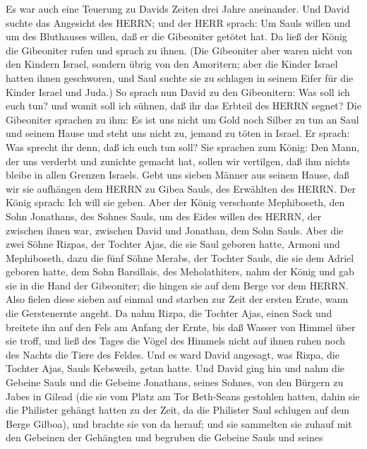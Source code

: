  Es war auch eine Teuerung zu Davids Zeiten drei Jahre
aneinander. Und David suchte das Angesicht des HERRN; und der HERR
sprach: Um Sauls willen und um des Bluthauses willen, daß er die
Gibeoniter getötet hat.  Da ließ der König die Gibeoniter
rufen und sprach zu ihnen. (Die Gibeoniter aber waren nicht von den
Kindern Israel, sondern übrig von den Amoritern; aber die Kinder Israel
hatten ihnen geschworen, und Saul suchte sie zu schlagen in seinem Eifer
für die Kinder Israel und Juda.)  So sprach nun David zu den
Gibeonitern: Was soll ich euch tun? und womit soll ich sühnen, daß ihr
das Erbteil des HERRN segnet?  Die Gibeoniter sprachen zu
ihm: Es ist uns nicht um Gold noch Silber zu tun an Saul und seinem
Hause und steht uns nicht zu, jemand zu töten in Israel. Er sprach: Was
sprecht ihr denn, daß ich euch tun soll?  Sie sprachen zum
König: Den Mann, der uns verderbt und zunichte gemacht hat, sollen wir
vertilgen, daß ihm nichts bleibe in allen Grenzen Israels. 
Gebt uns sieben Männer aus seinem Hause, daß wir sie aufhängen dem HERRN
zu Gibea Sauls, des Erwählten des HERRN. Der König sprach: Ich will sie
geben.  Aber der König verschonte Mephiboseth, den Sohn
Jonathans, des Sohnes Sauls, um des Eides willen des HERRN, der zwischen
ihnen war, zwischen David und Jonathan, dem Sohn Sauls. 
Aber die zwei Söhne Rizpas, der Tochter Ajas, die sie Saul geboren
hatte, Armoni und Mephiboseth, dazu die fünf Söhne Merabs, der Tochter
Sauls, die sie dem Adriel geboren hatte, dem Sohn Barsillais, des
Meholathiters, nahm der König  und gab sie in die Hand der
Gibeoniter; die hingen sie auf dem Berge vor dem HERRN. Also fielen
diese sieben auf einmal und starben zur Zeit der ersten Ernte, wann die
Gerstenernte angeht.  Da nahm Rizpa, die Tochter Ajas,
einen Sack und breitete ihn auf den Fels am Anfang der Ernte, bis daß
Wasser von Himmel über sie troff, und ließ des Tages die Vögel des
Himmels nicht auf ihnen ruhen noch des Nachts die Tiere des Feldes.
 Und es ward David angesagt, was Rizpa, die Tochter Ajas,
Sauls Kebsweib, getan hatte.  Und David ging hin und nahm
die Gebeine Sauls und die Gebeine Jonathans, seines Sohnes, von den
Bürgern zu Jabes in Gilead (die sie vom Platz am Tor Beth-Seans
gestohlen hatten, dahin sie die Philister gehängt hatten zu der Zeit, da
die Philister Saul schlugen auf dem Berge Gilboa),  und
brachte sie von da herauf; und sie sammelten sie zuhauf mit den Gebeinen
der Gehängten  und begruben die Gebeine Sauls und seines
